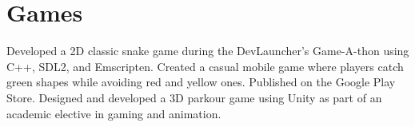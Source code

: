\section{Games}
  \resumeSubHeadingListStart
      {Developed a 2D classic snake game during the DevLauncher's Game-A-thon using C++, SDL2, and Emscripten.}
      {Created a casual mobile game where players catch green shapes while avoiding red and yellow ones. Published on the Google Play Store.}
      {Designed and developed a 3D parkour game using Unity as part of an academic elective in gaming and animation.}


  \resumeSubHeadingListEnd